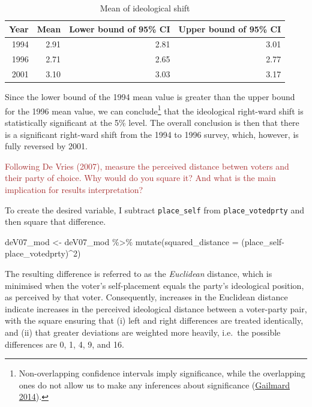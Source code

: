 \documentclass[
]{article}
\newenvironment{Shaded}{\begin{snugshade}}{\end{snugshade}}
\newcommand{\AttributeTok}[1]{\textcolor[rgb]{0.77,0.63,0.00}{#1}}
\newcommand{\DecValTok}[1]{\textcolor[rgb]{0.00,0.00,0.81}{#1}}
\newcommand{\FunctionTok}[1]{\textcolor[rgb]{0.00,0.00,0.00}{#1}}
\newcommand{\NormalTok}[1]{#1}
\newcommand{\OtherTok}[1]{\textcolor[rgb]{0.56,0.35,0.01}{#1}}
\newcommand{\SpecialCharTok}[1]{\textcolor[rgb]{0.00,0.00,0.00}{#1}}
\begin{document}
\begin{table}[!h]

\caption{\label{tab:ideo-shift-table}Mean of ideological shift}
\centering
\begin{tabular}[t]{rrrr}
\toprule
Year & Mean & Lower bound of 95\% CI & Upper bound of 95\% CI\\
\midrule
1994 & 2.91 & 2.81 & 3.01\\
1996 & 2.71 & 2.65 & 2.77\\
2001 & 3.10 & 3.03 & 3.17\\
\bottomrule
\end{tabular}
\end{table}

Since the lower bound of the 1994 mean value is greater than the upper
bound for the 1996 mean value, we can conclude\footnote{Non-overlapping
  confidence intervals imply significance, while the overlapping ones do
  not allow us to make any inferences about significance
  (\protect\hyperlink{ref-gailmard_statistical_2014}{Gailmard 2014}).}
that the ideological right-ward shift is statistically significant at
the 5\% level. The overall conclusion is then that there is a
significant right-ward shift from the 1994 to 1996 survey, which,
however, is fully reversed by 2001.

\textcolor{brown}{Following De Vries (2007), measure the perceived distance betwen voters and their party of choice. Why would do you square it? And what is the main implication for results interpretation?}

To create the desired variable, I subtract \texttt{place\_self} from
\texttt{place\_votedprty} and then square that difference.

\begin{Shaded}
\begin{Highlighting}[]
\NormalTok{deV07\_mod }\OtherTok{\textless{}{-}}\NormalTok{ deV07\_mod }\SpecialCharTok{\%\textgreater{}\%}
  \FunctionTok{mutate}\NormalTok{(}\AttributeTok{squared\_distance =}\NormalTok{ (place\_self}\SpecialCharTok{{-}}\NormalTok{place\_votedprty)}\SpecialCharTok{\^{}}\DecValTok{2}\NormalTok{)  }
\end{Highlighting}
\end{Shaded}

The resulting difference is referred to as the \emph{Euclidean}
distance, which is minimised when the voter's self-placement equals the
party's ideological position, as perceived by that voter. Consequently,
increases in the Euclidean distance indicate increases in the perceived
ideological distance between a voter-party pair, with the square
ensuring that (i) left and right differences are treated identically,
and (ii) that greater deviations are weighted more heavily, i.e.~the
possible differences are 0, 1, 4, 9, and 16.
\end{document}
